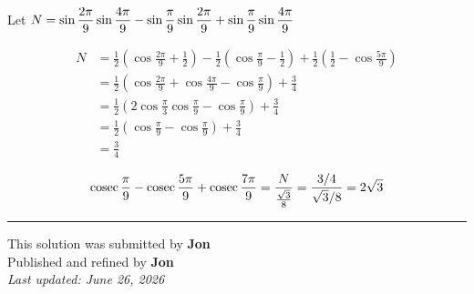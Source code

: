 \documentclass[12pt]{article}
\begin{document}
Let $\displaystyle N=\sin\frac{2\pi}{9}\sin\frac{4\pi}{9}-\sin\frac{\pi}{9}\sin\frac{2\pi}{9}+\sin\frac{\pi}{9}\sin\frac{4\pi}{9}$

\begin{align*}
N
&=\frac12\left(\cos\frac{2\pi}{9}+\frac12\right)-\frac12\left(\cos\frac{\pi}{9}-\frac12\right)+\frac12\left(\frac12-\cos\frac{5\pi}{9}\right)\\
&=\frac12\left(\cos\frac{2\pi}{9}+\cos\frac{4\pi}{9}-\cos\frac{\pi}{9}\right)+\frac34\\
&=\frac12\left(2\cos\frac{\pi}{3}\cos\frac{\pi}{9}-\cos\frac{\pi}{9}\right)+\frac34\\
&=\frac12\left(\cos\frac{\pi}{9}-\cos\frac{\pi}{9}\right)+\frac34\\
&=\frac34
\end{align*}


$$\operatorname{cosec}\frac{\pi}{9}-\operatorname{cosec}\frac{5\pi}{9}+\operatorname{cosec}\frac{7\pi}{9}=\frac{N}{\frac{\sqrt3}{8}}=\frac{3/4}{\sqrt3/8}=2\sqrt3$$

\bigskip
\hrule
\begin{center}
    This solution was submitted by \textbf{Jon}\\[4pt]
    Published and refined by \textbf{Jon}\\[8pt]
    \textit{Last updated: June 26, 2026}
\end{center}
\end{document}
